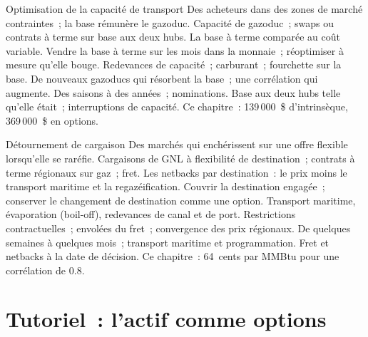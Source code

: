 \begin{strategyfile}{Optimisation de la capacité de transport}\label{strat:s2:storage-transport-and-physical-optionality:transport}
 Des acheteurs dans des zones de marché contraintes~; la base rémunère le gazoduc.
 Capacité de gazoduc~; swaps ou contrats à terme sur base aux deux hubs.
 La base à terme comparée au coût variable.
 Vendre la base à terme sur les mois dans la monnaie~; réoptimiser à mesure qu'elle bouge.
 Redevances de capacité~; carburant~; fourchette sur la base.
 De nouveaux gazoducs qui résorbent la base~; une corrélation qui augmente.
 Des saisons à des années~; nominations.
 Base aux deux hubs telle qu'elle était~; interruptions de capacité.
 Ce chapitre~: 139\,000~\$ d'intrinsèque, 369\,000~\$ en options.
\end{strategyfile}

\begin{strategyfile}{Détournement de cargaison}\label{strat:s2:storage-transport-and-physical-optionality:cargo}
 Des marchés qui enchérissent sur une offre flexible lorsqu'elle se raréfie.
 Cargaisons de GNL à flexibilité de destination~; contrats à terme régionaux sur gaz~; fret.
 Les netbacks par destination~: le prix moins le transport maritime et la regazéification.
 Couvrir la destination engagée~; conserver le changement de destination comme une option.
 Transport maritime, évaporation (boil-off), redevances de canal et de port.
 Restrictions contractuelles~; envolées du fret~; convergence des prix régionaux.
 De quelques semaines à quelques mois~; transport maritime et programmation.
 Fret et netbacks à la date de décision.
 Ce chapitre~: 64~cents par MMBtu pour une corrélation de 0.8.
\end{strategyfile}

\section{Tutoriel~: l'actif comme options}\label{tut:s2:storage-transport-and-physical-optionality:tut}

